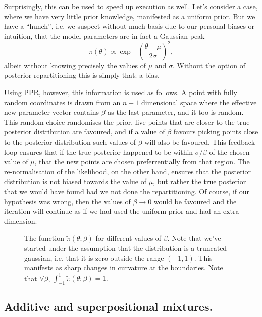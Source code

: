 \documentclass[usenatbib]{mnras}
\begin{document}
Surprisingly, this can be used to speed up execution as well. Let's
consider a case, where we have very little prior knowledge,
manifested as a uniform prior. But we have a ``hunch'', i.e. we
suspect without much basis due to our personal biases or intuition,
that the model parameters are in fact a Gaussian peak
\begin{equation}
 \pi (\theta) \propto \exp{ -\left(\frac{\theta - \mu}{2\sigma}\right)^{2}},
\end{equation}
albeit without knowing precisely the values of \(\mu\) and
\(\sigma\). Without the option of posterior repartitioning this is
simply that: a bias. 

Using PPR, however, this information is used as follows. A point
with fully random coordinates is drawn from an \(n+1\) dimensional
space where the effective new parameter vector contains \(\beta\)
as the last parameter, and it too is random. This random choice
randomises the prior, live points that are closer to the true
posterior distribution are favoured, and if a value of \(\beta\)
favours picking points close to the posterior distribution such
values of \(\beta\) will also be favoured. This feedback loop
ensures that if the true posterior happened to be within \(\sigma /
   \beta\) of the chosen value of \(\mu\), that the new points are
chosen preferrentially from that region. The re-normalisation of
the likelihood, on the other hand, ensures that the posterior
distribution is not biased towards the value of \(\mu\), but rather
the true posterior that we would have found had we not done the
repartitioning. Of course, if our hypothesis was wrong, then the
values of \(\beta \rightarrow 0\) would be favoured and the
iteration will continue as if we had used the uniform prior and had
an extra dimension.

\begin{figure}
 
\caption{\label{org72d5365}
The function \(\tilde{\pi}(\theta; \beta)\) for different values of \(\beta\). Note that we've started under the assumption that the distribution is a truncated gaussian, i.e. that it is zero outside the range \((-1, 1)\). This manifests as sharp changes in curvature at the boundaries. Note that \(\forall \beta\), \(\int_{-1}^{1}\tilde{\pi}(\theta; \beta) = 1\).}
\end{figure}

\subsection{Additive and superpositional mixtures.}
\label{sec:orgc51b3cc}
\end{document}
